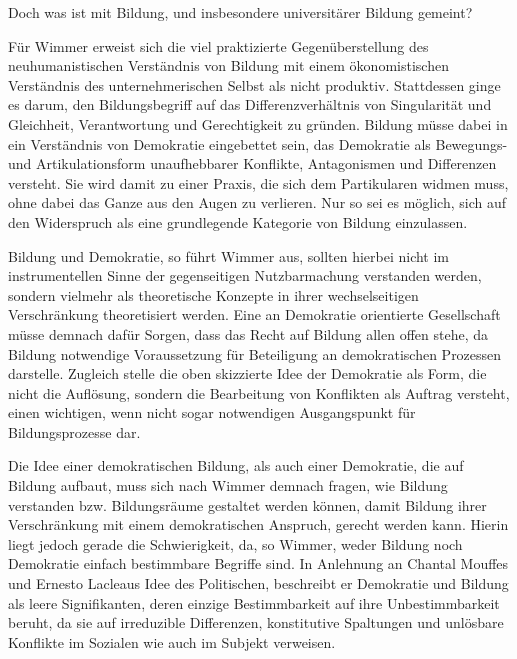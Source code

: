 Doch was ist mit Bildung, und insbesondere universitärer
Bildung gemeint? 

Für Wimmer erweist sich die viel praktizierte Gegenüberstellung des
neuhumanistischen Verständnis von Bildung mit einem ökonomistischen Verständnis
des unternehmerischen Selbst als nicht produktiv. Stattdessen ginge es darum,
\glqq den Bildungsbegriff auf das Differenzverhältnis von Singularität und
Gleichheit, Verantwortung und Gerechtigkeit zu gründen.\grqq \footnotemark
{} Bildung müsse dabei
in ein Verständnis von Demokratie eingebettet sein, das Demokratie als
\glqq Bewegungs- und Artikulationsform unaufhebbarer Konflikte, Antagonismen und
Differenzen \grqq versteht. Sie wird damit zu einer Praxis, die sich dem
Partikularen widmen muss, ohne dabei das Ganze aus den Augen zu verlieren. Nur
so sei es möglich, sich auf den Widerspruch als eine grundlegende Kategorie von
Bildung einzulassen.

Bildung und Demokratie, so führt Wimmer aus, sollten
hierbei nicht im instrumentellen Sinne der gegenseitigen Nutzbarmachung
verstanden werden, sondern vielmehr als theoretische Konzepte in ihrer
wechselseitigen Verschränkung theoretisiert werden. Eine an Demokratie
orientierte Gesellschaft müsse demnach dafür Sorgen, dass das Recht auf Bildung
allen offen stehe, da Bildung notwendige Voraussetzung für Beteiligung an
demokratischen Prozessen darstelle. Zugleich stelle die oben skizzierte Idee
der Demokratie als Form, die nicht die Auflösung, sondern die Bearbeitung von
Konflikten als Auftrag versteht, einen wichtigen, wenn nicht sogar notwendigen
Ausgangspunkt für Bildungsprozesse dar.\footnotemark {} 

Die Idee einer demokratischen Bildung,
als auch einer Demokratie, die auf Bildung aufbaut, muss sich nach Wimmer
demnach fragen, wie Bildung verstanden bzw. Bildungsräume gestaltet werden
können, damit Bildung ihrer Verschränkung mit einem demokratischen Anspruch,
gerecht werden kann. Hierin liegt jedoch gerade die Schwierigkeit, da, so
Wimmer, weder Bildung noch Demokratie einfach bestimmbare Begriffe sind. In
Anlehnung an Chantal Mouffes und Ernesto Lacleaus Idee des Politischen,
beschreibt er Demokratie und Bildung als leere Signifikanten, deren einzige
Bestimmbarkeit auf ihre Unbestimmbarkeit beruht, da sie \glqq auf irreduzible
Differenzen, konstitutive Spaltungen und unlösbare Konflikte im Sozialen wie
auch im Subjekt\grqq \footnotemark {} verweisen. 

